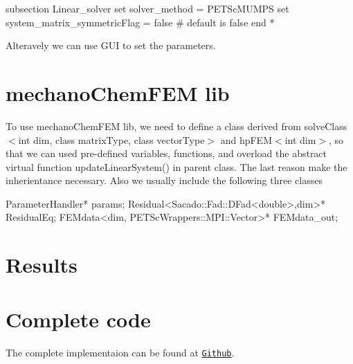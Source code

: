 \begin{DoxyCode}
subsection Linear\_solver
        set solver\_method = PETScMUMPS
        set system\_matrix\_symmetricFlag = \textcolor{keyword}{false} # \textcolor{keywordflow}{default} is \textcolor{keyword}{false}
end
*
\end{DoxyCode}
 Alteravely we can use G\-U\-I to set the parameters. \hypertarget{brain_morph_lib}{}\section{mechano\-Chem\-F\-E\-M lib}\label{brain_morph_lib}
To use mechano\-Chem\-F\-E\-M lib, we need to define a class derived from {\ttfamily solve\-Class$<$int dim, class matrix\-Type, class vector\-Type$>$} and {\ttfamily hp\-F\-E\-M$<$int dim$>$}, so that we can used pre-\/defined variables, functions, and overload the abstract virtual function {\ttfamily update\-Linear\-System()} in parent class. The last reason make the inherientance necessary. Also we usually include the following three classes 
\begin{DoxyCode}
ParameterHandler* params;   
Residual<Sacado::Fad::DFad<double>,dim>* ResidualEq;
FEMdata<dim, PETScWrappers::MPI::Vector>* FEMdata\_out;
\end{DoxyCode}
 \hypertarget{growth_results}{}\section{Results}\label{growth_results}
    \hypertarget{brain_morph_com}{}\section{Complete code}\label{brain_morph_com}
The complete implementaion can be found at \href{https://github.com/mechanoChem/mechanoChemFEM/tree/example/brainMorph}{\tt Github}. 